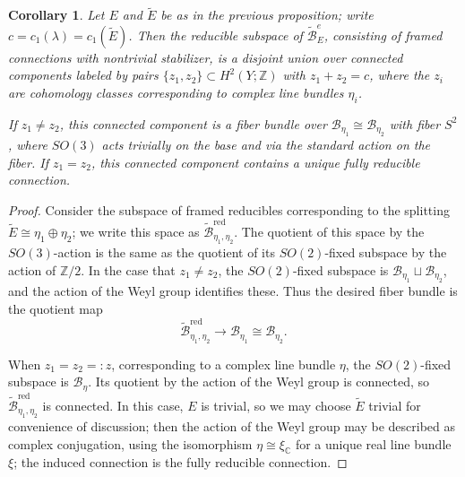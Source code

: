 \documentclass[10pt,a4paper]{amsart}
\newtheorem{corollary}[theorem]{Corollary}
\theoremstyle{definition}
\theoremstyle{remark}
\numberwithin{figure}{qchap}
\begin{document}
\begin{corollary}\label{orbits1}Let $E$ and $\tilde E$ be as in the previous proposition; write $c = c_1(\lambda) = c_1(\tilde E)$. Then the reducible subspace of $\widetilde{\mathcal B}^e_E$, consisting of framed connections with nontrivial stabilizer, is a disjoint union over connected components labeled by pairs $\{z_1, z_2\} \subset H^2(Y;\mathbb Z)$ with $z_1 + z_2 = c$, where the $z_i$ are cohomology classes corresponding to complex line bundles $\eta_i$.

If $z_1 \neq z_2$, this connected component is a fiber bundle over $\mathcal B_{\eta_1}\cong \mathcal B_{\eta_2}$ with fiber $S^2$, where $SO(3)$ acts trivially on the base and via the standard action on the fiber. 
If $z_1 = z_2$, this connected component contains a unique fully reducible connection.
\end{corollary}

\begin{proof}Consider the subspace of framed reducibles corresponding to the splitting $\tilde E \cong \eta_1 \oplus \eta_2$; we write this space as $\widetilde{\mathcal B}^{\text{red}}_{\eta_1, \eta_2}$. The quotient of this space by the $SO(3)$-action is the same as the quotient of its $SO(2)$-fixed subspace by the action of $\mathbb Z/2$. In the case that $z_1 \neq z_2$, the $SO(2)$-fixed subspace is $\mathcal B_{\eta_1} \sqcup \mathcal B_{\eta_2}$, and the action of the Weyl group identifies these. Thus the desired fiber bundle is the quotient map $$\widetilde{\mathcal B}^{\text{red}}_{\eta_1, \eta_2} \to \mathcal B_{\eta_1} \cong \mathcal B_{\eta_2}.$$ 

When $z_1 = z_2 =: z$, corresponding to a complex line bundle $\eta$, the $SO(2)$-fixed subspace is $\mathcal B_{\eta}$. Its quotient by the action of the Weyl group is connected, so $\widetilde{\mathcal B}^{\text{red}}_{\eta_1, \eta_2}$ is connected. In this case, $E$ is trivial, so we may choose $\tilde E$ trivial for convenience of discussion; then the action of the Weyl group may be described as complex conjugation, using the isomorphism $\eta \cong \xi_{\mathbb C}$ for a unique real line bundle $\xi$; the induced connection is the fully reducible connection.
\end{proof}
\end{document}

